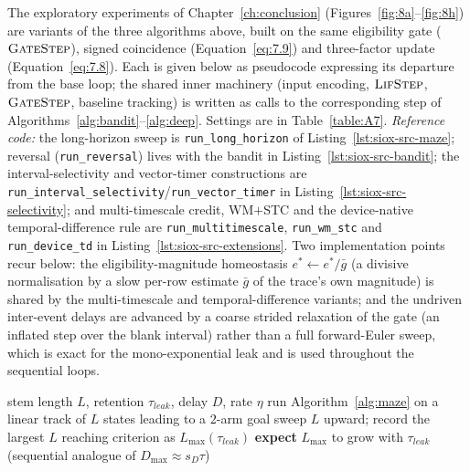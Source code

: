 \noindent The exploratory experiments of Chapter~\ref{ch:conclusion}
(Figures~\ref{fig:8a}--\ref{fig:8h}) are variants of the three algorithms above, built
on the same eligibility gate ($\textsc{GateStep}$), signed coincidence
(Equation~\ref{eq:7.9}) and three-factor update (Equation~\ref{eq:7.8}). Each is given
below as pseudocode expressing its departure from the base loop; the shared inner
machinery (input encoding, $\textsc{LifStep}$, $\textsc{GateStep}$, baseline tracking)
is written as calls to the corresponding step of Algorithms~\ref{alg:bandit}--\ref{alg:deep}.
Settings are in Table~\ref{table:A7}. \emph{Reference code:} the long-horizon sweep is
\texttt{run\_long\_horizon} of Listing~\ref{lst:siox-src-maze}; reversal (\texttt{run\_reversal})
lives with the bandit in Listing~\ref{lst:siox-src-bandit}; the interval-selectivity and
vector-timer constructions are \texttt{run\_interval\_selectivity}/\texttt{run\_vector\_timer}
in Listing~\ref{lst:siox-src-selectivity}; and multi-timescale credit, WM$+$STC and the
device-native temporal-difference rule are \texttt{run\_multitimescale},
\texttt{run\_wm\_stc} and \texttt{run\_device\_td} in Listing~\ref{lst:siox-src-extensions}.
Two implementation points recur below: the eligibility-magnitude homeostasis
$e^{\ast}\!\gets\!e^{\ast}/\bar g$ (a divisive normalisation by a slow per-row estimate
$\bar g$ of the trace's own magnitude) is shared by the multi-timescale and
temporal-difference variants; and the undriven inter-event delays are advanced by a coarse
strided relaxation of the gate (an inflated step over the blank interval) rather than a
full forward-Euler sweep, which is exact for the mono-exponential leak and is used
throughout the sequential loops.

\begin{algorithm}[htbp!]
\caption{Long-horizon credit on a length-$L$ trajectory (Figure~\ref{fig:8a}).}
\label{alg:longhorizon}
\begin{algorithmic}[1]
\Require stem length $L$, retention $\tau_{leak}$, delay $D$, rate $\eta$
\State run Algorithm~\ref{alg:maze} on a linear track of $L$ states leading to a $2$-arm goal
\State {}
\State sweep $L$ upward; record the largest $L$ reaching criterion as $L_{\max}(\tau_{leak})$
\State \textbf{expect} $L_{\max}$ to grow with $\tau_{leak}$ (sequential analogue of $D_{\max}\!\approx\!s_D\tau$)
\end{algorithmic}
\end{algorithm}

